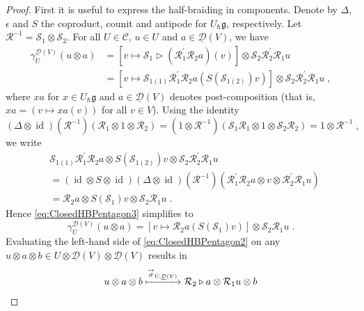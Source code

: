 \documentclass[12pt,dvipsnames]{article}
\numberwithin{equation}{section}
\theoremstyle{definition}
\newcommand{\cat}[1]{\mathcal{#1}}
\newcommand{\1}{\ensuremath{\mathbbm{1}}}
\DeclareMathOperator{\Id}{id}
\newcommand{\lc}{\ensuremath{\overset{\rightarrow}{\sigma}}}
\begin{document}
\begin{proof}
    First it is useful to express the half-braiding in components. Denote by $\Delta$, $\epsilon$ and $S$ the coproduct, counit and antipode for $U_\hbar\mathfrak{g}$, respectively. Let $\mathcal{R}^{-1} = \mathcal{S}_1\otimes\mathcal{S}_2$. For all $U\in\cat{C}$, $u\in U$ and $a\in\underline{\cat{D}}(V)$, we have
    \begin{align}\label{eq:ClosedHBPentagon3}
        \gamma_U^{\underline{\cat{D}}(V)}(u\otimes a) &= [ v\mapsto \mathcal{S}_1\triangleright(\mathcal{R}_1^\prime\mathcal{R}_2a)(v)]\otimes \mathcal{S}_2\mathcal{R}_2^\prime\mathcal{R}_1u \nonumber\\
        &= [ v\mapsto \mathcal{S}_{1(1)}\mathcal{R}_1^\prime\mathcal{R}_2a(S(\mathcal{S}_{1(2)})v)]\otimes \mathcal{S}_2\mathcal{R}_2^\prime\mathcal{R}_1u \;,
    \end{align}
    where $xa$ for $x\in U_\hbar\mathfrak{g}$ and $a\in\underline{\cat{D}}(V)$ denotes post-composition (that is, $xa = (v\mapsto xa(v))$ for all $v\in V$). Using the identity 
    \begin{equation}
        (\Delta\otimes\Id)(\mathcal{R}^{-1})(\mathcal{R}_1\otimes1\otimes\mathcal{R}_2) = (1\otimes \mathcal{R}^{-1})(\mathcal{S}_1\mathcal{R}_1\otimes1\otimes\mathcal{S}_2\mathcal{R}_2) = 1\otimes\mathcal{R}^{-1} \;,
    \end{equation}
    we write
    \begin{align}
        &\mathcal{S}_{1(1)}\mathcal{R}_1^\prime\mathcal{R}_2 a \otimes S(\mathcal{S}_{1(2)})v \otimes \mathcal{S}_2\mathcal{R}_2^\prime\mathcal{R}_1 u 
        \nonumber \\
        &= (\Id\otimes S\otimes\Id)(\Delta\otimes\Id)(\mathcal{R}^{-1})(\mathcal{R}_1^\prime\mathcal{R}_2 a \otimes v \otimes \mathcal{R}_2^\prime\mathcal{R}_1 u) \nonumber\\
        &= \mathcal{R}_2 a \otimes S(\mathcal{S}_1)v \otimes \mathcal{S}_2\mathcal{R}_1 u \;.
    \end{align}
    Hence \eqref{eq:ClosedHBPentagon3} simplifies to
    \begin{equation}
        \gamma_U^{\underline{\cat{D}}(V)}(u\otimes a) = [v\mapsto \mathcal{R}_2 a(S(\mathcal{S}_1)v)]\otimes \mathcal{S}_2\mathcal{R}_1 u \;.
    \end{equation}
    Evaluating the left-hand side of \eqref{eq:ClosedHBPentagon2} on any $u\otimes a\otimes b\in U\otimes\underline{\cat{D}}(V)\otimes\underline{\cat{D}}(V)$ results in
    \begin{align}\label{eq:ClosedHBPentagon4}
        u\otimes a\otimes b &\xmapsto{\lc_{U,\underline{\cat{D}}(V)}} \mathcal{R}_2\triangleright a\otimes \mathcal{R}_1 u \otimes b \nonumber\\

\end{align}
\end{proof}
\end{document}
